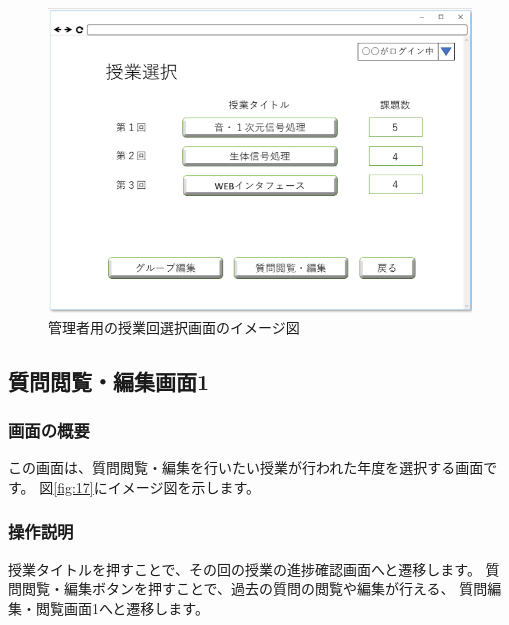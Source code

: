 \begin{figure}[htbp]
  \begin{center}
    \includegraphics[width=1\linewidth,clip]{./img/16.png}
    \caption{管理者用の授業回選択画面のイメージ図}\label{fig:16}
  \end{center}
\end{figure}

\newpage

\subsection{質問閲覧・編集画面1}
\subsubsection{画面の概要}
この画面は、質問閲覧・編集を行いたい授業が行われた年度を選択する画面です。
図\ref{fig:17}にイメージ図を示します。

\subsubsection{操作説明}
授業タイトルを押すことで、その回の授業の進捗確認画面へと遷移します。
質問閲覧・編集ボタンを押すことで、過去の質問の閲覧や編集が行える、
質問編集・閲覧画面1へと遷移します。

